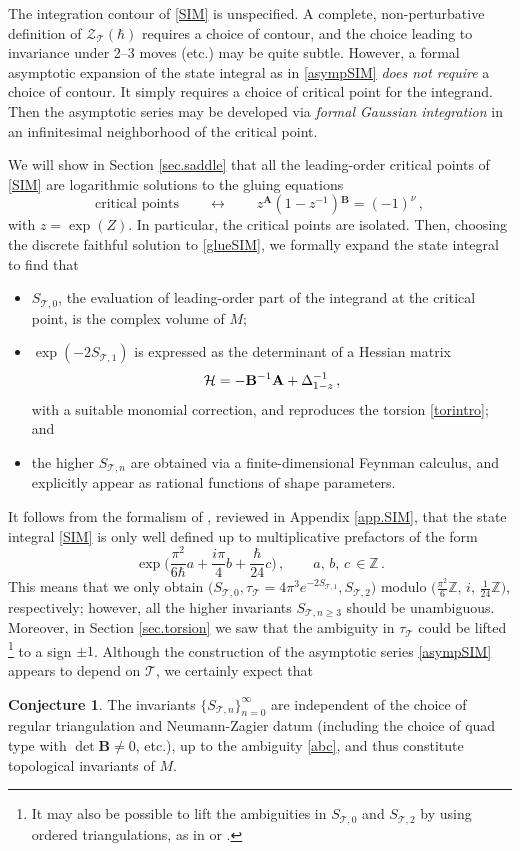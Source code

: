 \documentclass[12pt]{amsart}
\theoremstyle{definition}
\newtheorem{conjecture}[theorem]{Conjecture}
\def\be{  \begin{equation} }
\def\ee{  \end{equation} }
\newcommand{\CZ}{\mathcal{Z}}
\newcommand{\CH}{\mathcal{H}}
\newcommand{\CT}{\mathcal{T}}
\newcommand{\Z}{\mathbb{Z}}
\newcommand{\mb}{\mathbf}
\numberwithin{equation}{section}
\begin{document}
The integration contour of \eqref{SIM} is unspecified. A complete, non-perturbative definition of $\CZ_\CT(\hbar)$ requires a choice of contour, and the choice leading to invariance under 2--3 moves (etc.) may be quite subtle. However, a formal asymptotic expansion of the state integral as in \eqref{asympSIM} \emph{does not require} a choice of contour. It simply requires a choice of critical point for the integrand. Then the asymptotic series may be developed via \emph{formal Gaussian integration} in an infinitesimal neighborhood of the critical point.

We will show in Section \ref{sec.saddle} that all the leading-order critical points of \eqref{SIM} are logarithmic solutions to the gluing equations
%
\be \label{glueSIM} \text{critical points}\qquad \longleftrightarrow \qquad  z{}^{\mb A}(1-z^{-1}){}^{\mb B} = (-1)^\nu\,, \ee
%
with $z=\exp(Z)$. In particular, the critical points are isolated. Then, choosing the discrete faithful solution to \eqref{glueSIM}, we formally expand the state integral to find that
%
\begin{itemize}
\item $S_{\CT,0}$, the evaluation of leading-order part of the integrand at the critical point, is the 
complex volume of $M$;
\item $\exp(-2S_{\CT,1})$ is expressed as the determinant of a Hessian matrix
%
\be \notag
\CH = -\mb B^{-1}\mb A+\Delta_{1-z}^{-1}\,, 
\ee
%
with a suitable monomial correction, and reproduces the torsion 
\eqref{torintro}; and
%
\item the higher $S_{\CT,n}$ are obtained via a finite-dimensional Feynman 
calculus, and explicitly appear as rational functions of shape parameters.
\end{itemize}


It follows from the formalism of \cite{D1}, reviewed in Appendix \ref{app.SIM}, that the state integral \eqref{SIM} is only well defined up to multiplicative prefactors of the form
%
\be \label{abc}
\exp\Big( \frac{\pi^2}{6\hbar}a+\frac{i\pi}{4}b+\frac{\hbar}{24}c\Big)\,,
\qquad a,\,b,\,c\,\in\Z\,.
\ee
%
This means that we only obtain $\big(S_{\CT,0},\tau_\CT=4\pi^3e^{-2S_{\CT,1}},S_{\CT,2}\big)$ modulo $\big(\tfrac{\pi^2}{6}\Z,\,i,\,\tfrac{1}{24}\Z\big)$, respectively; however, all the higher invariants $S_{\CT,n\geq 3}$ should be unambiguous. Moreover, in Section \ref{sec.torsion} we saw that the ambiguity in $\tau_\CT$ could be lifted%
%
\footnote{It may also be possible to lift the ambiguities in $S_{\CT,0}$ and $S_{\CT,2}$ by using ordered triangulations, as in \cite{N} or \cite{Zickert-rep}.} %
%
to a sign $\pm 1$. Although the construction of the asymptotic series \eqref{asympSIM} appears to depend on $\CT$, we certainly expect that
%
\begin{conjecture}\label{conj.Sn}
The invariants $\big\{S_{\CT,n}\big\}_{n=0}^\infty$ are independent of the choice of regular triangulation and Neumann-Zagier datum (including the choice of quad type with $\det \mb B\neq 0$, etc.), up to the ambiguity \eqref{abc}, and thus constitute topological invariants of $M$.
\end{conjecture}
\end{document}
